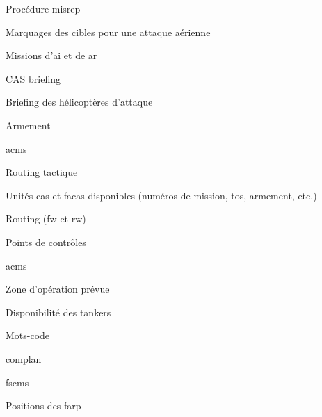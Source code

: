 \begin{e1}
\begin{e2}
\begin{e3}
\begin{e4}
\begin{e5}[-1em]
					\item Procédure \gls{misrep}
					\item Marquages des cibles pour une attaque aérienne
					\item Missions d'\gls{ai} et de \gls{ar}
					\item CAS briefing
					\item Briefing des hélicoptères d'attaque
					\item Armement
					\item \glspl{acm}
					\item Routing tactique
				\end{e5}
				\begin{e5}[-1em]
					\item Unités \gls{cas} et \glspl{faca} disponibles (numéros de mission, \gls{tos}, armement, etc.)
					\item Routing (\gls{fw} et \gls{rw})
					\item Points de contrôles
					\item \glspl{acm}
					\item Zone d'opération prévue
					\item Disponibilité des tankers
					\item Mots-code
					\item \gls{complan}
					\item \glspl{fscm}
					\item Positions des \gls{farp}
				\end{e5}
			\end{e4}
		\end{e3}
	\end{e2}
\end{e1}
